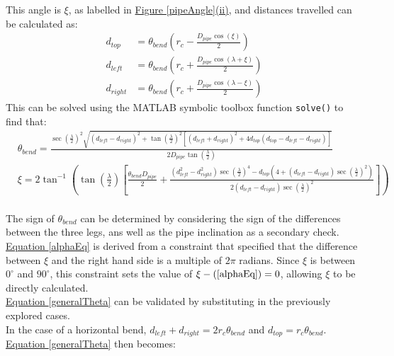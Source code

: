 \documentclass[11pt]{article}		%
\newcommand{\equationref}[1]{\hyperref[#1]{Equation \ref*{#1}}}     %
\begin{document}
			This angle is $\xi$, as labelled in \hyperref[pipeAngle]{Figure \ref*{pipeAngle}(ii)}, and distances travelled can be calculated as:
			\begin{align}
				d_{top} &= \theta_{bend} \left( r_c - \frac{D_{pipe} \cos \left( \xi \right)}{2} \right) \label{d_top}
				\\
				d_{left} &= \theta_{bend} \left( r_c +  \frac{D_{pipe} \cos \left( \lambda + \xi \right)}{2} \right) \label{d_left}
				\\
				d_{right} &= \theta_{bend} \left( r_c +  \frac{D_{pipe} \cos \left( \lambda - \xi \right)}{2} \right) \label{d_right}
			\end{align}
			This can be solved using the MATLAB symbolic toolbox function \verb|solve()| to find that:
			\begin{align}
				&\theta_{bend} = \frac{ \sec \left( \frac{\lambda}{2} \right)^2 \sqrt{ \left( d_{left} - d_{right} \right)^2 +  \tan \left( \frac{\lambda}{2} \right)^2 \left[ \left( d_{left} + d_{right} \right)^2 + 4 d_{top} \left( d_{top} - d_{left} - d_{right} \right) \right] } }{2 D_{pipe} \tan \left( \frac{\lambda}{2} \right)} \label{generalTheta}
				\\
				&\xi = 2 \tan^{-1} \left( \tan \left( \frac{\lambda}{2} \right) \left[\frac{ \theta_{bend} D_{pipe}}{2} + \frac{\left( d_{left}^2 - d_{right}^2 \right) \sec \left( \frac{\lambda}{2} \right)^4 - d_{top} \left(4 + \left( d_{left} - d_{right} \right) \sec \left( \frac{\lambda}{2} \right)^2 \right)}{2 \left( d_{left} - d_{right} \right) \sec \left( \frac{\lambda}{2} \right)^2} \right] \right) \label{alphaEq}
			\end{align}
			\\
	        \hspace*{2ex}The sign of $\theta_{bend}$ can be determined by considering the sign of the differences between the three legs, ans well as the pipe inclination as a secondary check.
			\\
	        \hspace*{2ex}\equationref{alphaEq} is derived from a constraint that specified that the difference between $\xi$ and the right hand side is a multiple of $2 \pi$ radians.
			Since $\xi$ is between $0^\circ$ and $90^\circ$, this constraint sets the value of $\xi - (\ref*{alphaEq}) = 0$, allowing $\xi$ to be directly calculated.
			\\
	        \hspace*{2ex}\equationref{generalTheta} can be validated by substituting in the previously explored cases.
\\
	        \hspace*{2ex}In the case of a horizontal bend, $d_{left} + d_{right} = 2 r_c \theta_{bend} $ and $d_{top} = r_c \theta_{bend}$.
			\equationref{generalTheta} then becomes:
			
\end{document}

